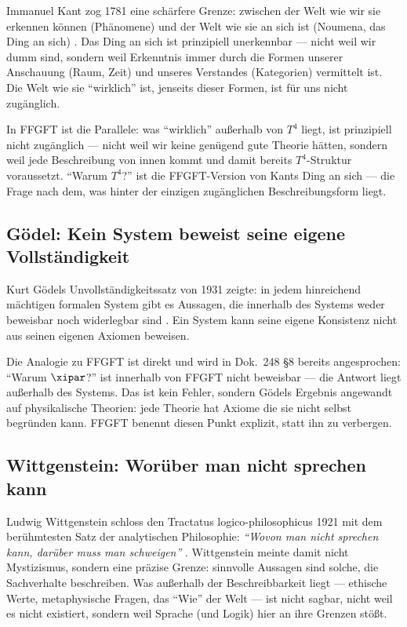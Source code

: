 Immanuel Kant zog 1781 eine schärfere Grenze: zwischen der Welt wie wir sie erkennen können (Phänomene) und der Welt wie sie an sich ist (Noumena, das Ding an sich) \cite{Kant1781}. Das Ding an sich ist prinzipiell unerkennbar --- nicht weil wir dumm sind, sondern weil Erkenntnis immer durch die Formen unserer Anschauung (Raum, Zeit) und unseres Verstandes (Kategorien) vermittelt ist. Die Welt wie sie ``wirklich'' ist, jenseits dieser Formen, ist für uns nicht zugänglich.

In FFGFT ist die Parallele: was ``wirklich'' außerhalb von $T^4$ liegt, ist prinzipiell nicht zugänglich --- nicht weil wir keine genügend gute Theorie hätten, sondern weil jede Beschreibung von innen kommt und damit bereits $T^4$-Struktur voraussetzt. ``Warum $T^4$?'' ist die FFGFT-Version von Kants Ding an sich --- die Frage nach dem, was hinter der einzigen zugänglichen Beschreibungsform liegt.

\subsection{Gödel: Kein System beweist seine eigene Vollständigkeit}

Kurt Gödels Unvollständigkeitssatz von 1931 zeigte: in jedem hinreichend mächtigen formalen System gibt es Aussagen, die innerhalb des Systems weder beweisbar noch widerlegbar sind \cite{Goedel1931}. Ein System kann seine eigene Konsistenz nicht aus seinen eigenen Axiomen beweisen.

Die Analogie zu FFGFT ist direkt und wird in Dok.~248 §8 bereits angesprochen: ``Warum $\xipar$?'' ist innerhalb von FFGFT nicht beweisbar --- die Antwort liegt außerhalb des Systems. Das ist kein Fehler, sondern Gödels Ergebnis angewandt auf physikalische Theorien: jede Theorie hat Axiome die sie nicht selbst begründen kann. FFGFT benennt diesen Punkt explizit, statt ihn zu verbergen.

\subsection{Wittgenstein: Worüber man nicht sprechen kann}

Ludwig Wittgenstein schloss den Tractatus logico-philosophicus 1921 mit dem berühmtesten Satz der analytischen Philosophie: \emph{``Wovon man nicht sprechen kann, darüber muss man schweigen''} \cite{Wittgenstein1921}. Wittgenstein meinte damit nicht Mystizismus, sondern eine präzise Grenze: sinnvolle Aussagen sind solche, die Sachverhalte beschreiben. Was außerhalb der Beschreibbarkeit liegt --- ethische Werte, metaphysische Fragen, das ``Wie'' der Welt --- ist nicht sagbar, nicht weil es nicht existiert, sondern weil Sprache (und Logik) hier an ihre Grenzen stößt.

